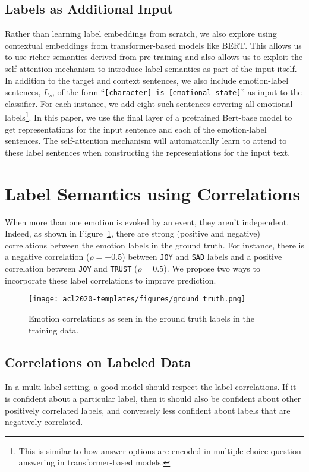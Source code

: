 \documentclass[11pt,a4paper]{article}
\begin{document}
\subsection{Labels as Additional Input}
Rather than learning label embeddings from scratch, we also explore using contextual embeddings from transformer-based models like BERT. This allows us to use richer semantics derived from pre-training and also allows us to exploit the self-attention mechanism to introduce label semantics as part of the input itself. In addition to the target and context sentences, we also include emotion-label sentences, $L_s$, of the form ``\texttt{[character] is [emotional state]}'' as input to the classifier. For each instance, we add eight such sentences covering all emotional labels\footnote{This is similar to how answer options are encoded in multiple choice question answering in transformer-based models.}. In this paper, we use the final layer of a pretrained Bert-base model to get representations for the input sentence and each of the emotion-label sentences. The self-attention mechanism will automatically learn to attend to these label sentences when constructing the representations for the input text. 

\section{Label Semantics using Correlations}
\label{sec:labelcorrelations}
When more than one emotion is evoked by an event, they aren't independent. Indeed, as shown in Figure~\ref{fig:label_corrrelations}, there are strong (positive and negative) correlations between the emotion labels in the ground truth. For instance, there is a negative correlation ($\rho = -0.5$) between \texttt{JOY} and \texttt{SAD} labels and a positive correlation between \texttt{JOY} and \texttt{TRUST} ($\rho = 0.5$). We propose two ways to incorporate these label correlations to improve prediction.
  \begin{figure}[t]
    
    \texttt{[image: acl2020-templates/figures/ground\_truth.png]}
    \caption{Emotion correlations as seen in the ground truth labels in the training data.
    }\label{fig:label_corrrelations}
  \end{figure}

\subsection{Correlations on Labeled Data}
\label{sec:softtraining}
In a multi-label setting, a good model should respect the label correlations. If it is confident about a particular label, then it should also be confident about other positively correlated labels, and conversely less confident about labels that are negatively correlated. 
\end{document}
